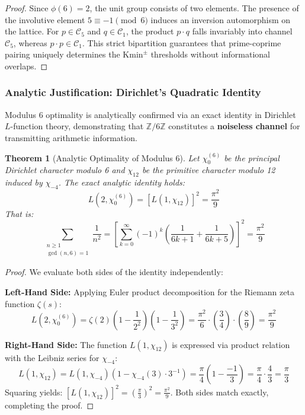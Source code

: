 \documentclass{article}
\numberwithin{equation}{section}
\theoremstyle{plain}
\newtheorem{theorem}{Theorem}[section]
\theoremstyle{definition}
\begin{document}
\begin{proof}
Since $\phi(6) = 2$, the unit group consists of two elements. The presence of the involutive element $5 \equiv -1 \pmod 6$ induces an inversion automorphism on the lattice. For $p \in \mathcal{C}_5$ and $q \in \mathcal{C}_1$, the product $p \cdot q$ falls invariably into channel $\mathcal{C}_5$, whereas $p \cdot p \in \mathcal{C}_1$. This strict bipartition guarantees that prime-coprime pairing uniquely determines the $\mathrm{Kmin}^\pm$ thresholds without informational overlaps.
\end{proof}

\subsubsection{Analytic Justification: Dirichlet's Quadratic Identity}

Modulus 6 optimality is analytically confirmed via an exact identity in Dirichlet $L$-function theory, demonstrating that $\mathbb{Z}/6\mathbb{Z}$ constitutes a \textbf{noiseless channel} for transmitting arithmetic information.

\begin{theorem}[Analytic Optimality of Modulus 6]
\label{thm:optimalidad-analitica}
Let $\chi_0^{(6)}$ be the principal Dirichlet character modulo 6 and $\chi_{12}$ be the primitive character modulo 12 induced by $\chi_{-4}$. The exact analytic identity holds:
\begin{equation}
L(2, \chi_0^{(6)}) = \left[ L(1, \chi_{12}) \right]^2 = \frac{\pi^2}{9}
\end{equation}
That is:
\begin{equation}
\sum_{\substack{n \ge 1 \\ \gcd(n,6)=1}} \frac{1}{n^2} = \left[ \sum_{k=0}^{\infty} (-1)^k \left( \frac{1}{6k+1} + \frac{1}{6k+5} \right) \right]^2 = \frac{\pi^2}{9}
\end{equation}
\end{theorem}

\begin{proof}
We evaluate both sides of the identity independently:

\noindent\textbf{Left-Hand Side:} Applying Euler product decomposition for the Riemann zeta function $\zeta(s)$:
\begin{equation}
L(2, \chi_0^{(6)}) = \zeta(2) \left(1 - \frac{1}{2^2}\right) \left(1 - \frac{1}{3^2}\right) = \frac{\pi^2}{6} \cdot \left(\frac{3}{4}\right) \cdot \left(\frac{8}{9}\right) = \frac{\pi^2}{9}
\end{equation}

\noindent\textbf{Right-Hand Side:} The function $L(1, \chi_{12})$ is expressed via product relation with the Leibniz series for $\chi_{-4}$:
\begin{equation}
L(1, \chi_{12}) = L(1, \chi_{-4}) \left(1 - \chi_{-4}(3) \cdot 3^{-1}\right) = \frac{\pi}{4} \left(1 - \frac{-1}{3}\right) = \frac{\pi}{4} \cdot \frac{4}{3} = \frac{\pi}{3}
\end{equation}
Squaring yields: $[L(1, \chi_{12})]^2 = \left(\frac{\pi}{3}\right)^2 = \frac{\pi^2}{9}$. Both sides match exactly, completing the proof.
\end{proof}
\end{document}
